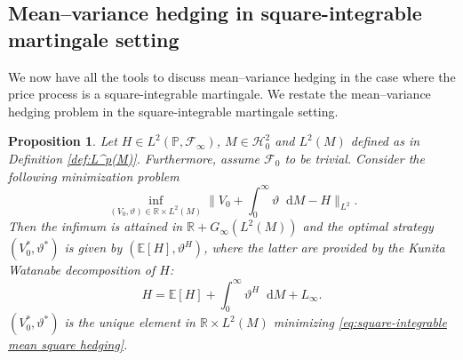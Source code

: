 \documentclass[11pt,a4paper,twoside,openany]{report}
\numberwithin{equation}{section}
\newcommand{\diff}{\mathop{}\!\mathrm{d}}
\theoremstyle{plain} %
\newtheorem{proposition}[theorem]{Proposition}
\theoremstyle{definition} %
\theoremstyle{remark} %
\begin{document}
\subsection{Mean--variance hedging in square-integrable martingale setting}\label{sec:mean--variance Hedging in square-integrable martingale setting}
We now have all the tools to discuss mean--variance hedging in the case where the price process is a square-integrable martingale. We restate the mean--variance hedging problem in the square-integrable martingale setting.
\begin{proposition}\label{prop:square-integrable mean--variance via KW}
    Let \(H\in L^2(\mathbb{P},\mathcal{F}_{\infty})\), \(M\in\mathcal{H}_{0}^2\) and \(L^2(M)\) defined as in Definition \ref{def:L^p(M)}. Furthermore, assume \(\mathcal{F}_0\) to be trivial.
    Consider the following minimization problem
    \begin{equation}\label{eq:square-integrable mean square hedging}
        \inf_{(V_0,\vartheta)\in \mathbb{R}\times L^2(M)}\bigg\lVert V_0+\int_{0}^{\infty}\vartheta\diff M-H\bigg\rVert_{L^2}.
    \end{equation}
    Then the infimum is attained in \(\mathbb{R}+G_{\infty}(L^2(M))\) and the optimal strategy \((V_0^*,\vartheta^*)\) is given by \((\mathbb{E}[H],\vartheta^H)\), where the latter are provided by the Kunita Watanabe decomposition of \(H\):
    \begin{equation*}
        H = \mathbb{E}[H]+\int_0^{\infty}\vartheta^H\diff M+L_{\infty}.
    \end{equation*}
    \((V_0^*,\vartheta^*)\) is the unique element in \(\mathbb{R}\times L^2(M)\) minimizing \eqref{eq:square-integrable mean square hedging}.
\end{proposition}
\end{document}
